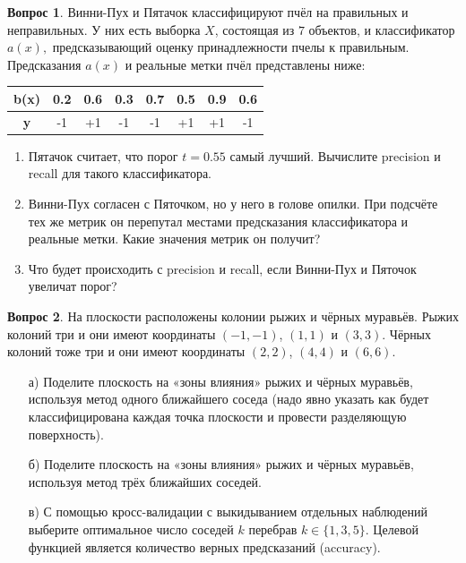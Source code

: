 \documentclass[12pt]{article}
\theoremstyle{definition}
\newtheorem{question}{Вопрос}
\begin{document}
\begin{question}
Винни-Пух и Пятачок классифицируют пчёл на правильных и неправильных. У них есть выборка $X$, состоящая из $7$ объектов, и классификатор $a(x),$ предсказывающий оценку принадлежности пчелы к правильным. Предсказания $a(x)$ и реальные метки пчёл представлены ниже: 

\begin{table}[h]
    \centering
    \begin{tabular}{>{\bfseries}cccccccc}
        \toprule
         b(x) & 0.2 & 0.6 & 0.3 & 0.7 & 0.5 & 0.9 & 0.6  \\ \midrule
         y & -1 & +1 & -1 & -1 & +1 & +1 & -1 \\
         \bottomrule
    \end{tabular}
\end{table}

\begin{enumerate}
    \item Пятачок считает, что порог $t=0.55$ самый лучший. Вычислите precision и recall для такого классификатора. 

    \item Винни-Пух согласен с Пяточком, но у него в голове опилки. При подсчёте тех же метрик он перепутал местами предсказания классификатора и реальные метки. Какие значения метрик он получит?
    
    \item Что будет происходить с precision и recall, если Винни-Пух и Пяточок увеличат порог? 
\end{enumerate}
\end{question}

\newpage 

\begin{question}
На плоскости расположены колонии рыжих и чёрных муравьёв. Рыжих колоний три и они имеют координаты $(-1, -1)$, $(1, 1)$ и $(3, 3)$. Чёрных колоний тоже три и они имеют координаты $(2, 2)$, $(4, 4)$ и $(6, 6)$.

\begin{enumerate}
  \item[а)] Поделите плоскость на «зоны влияния» рыжих и чёрных муравьёв, используя метод одного ближайшего соседа (надо явно указать как будет классифицирована каждая точка плоскости и провести разделяющую поверхность). 
  \item[б)] Поделите плоскость на «зоны влияния» рыжих и чёрных муравьёв, используя метод трёх ближайших соседей.
  \item[в)] С помощью кросс-валидации с выкидыванием отдельных наблюдений выберите оптимальное число соседей $k$ перебрав $k \in \{1, 3, 5\}$. Целевой функцией является количество верных предсказаний (accuracy).
\end{enumerate}
\end{question}
\end{document}
